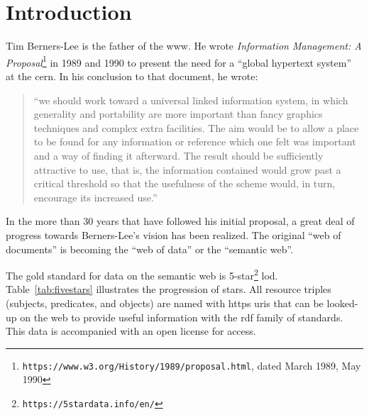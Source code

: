 
\chapter{Introduction}
\label{chap:intro}

\begin{doublespace}

Tim Berners-Lee is the father of the \ac{www}. 
He wrote 
\emph{Information Management: A Proposal}\footnote{{\tt https://www.w3.org/History/1989/proposal.html}, dated March 1989, May 1990} 
in 1989 and 1990 to present the need for a 
``global hypertext system'' at the \ac{cern}. 
In his conclusion to that document, he wrote:
\blockquote
{``we should work toward a universal linked information system, 
in which generality and portability are more important than fancy graphics techniques and complex extra facilities. 
The aim would be to allow a place to be found for any information or reference which one felt was important and a way of finding it afterward. 
The result should be sufficiently attractive to use, that is, 
the information contained would grow past a critical threshold so that the usefulness of the scheme would, in turn, 
encourage its increased use.''}

In the more than 30 years that have followed his initial proposal,
a great deal of progress towards Berners-Lee's vision has been realized. 
The original 
``web of documents'' is becoming the 
``web of data'' or the
``semantic web''. 

The gold standard for data on the semantic web is
5-star\footnote{\tt https://5stardata.info/en/} \ac{lod}.
Table~\ref{tab:fivestars} illustrates the progression of stars.
All resource triples (subjects, predicates, and objects) 
are named with \ac{https} \acp{uri} that can be looked-up on the web
to provide useful information with the \ac{rdf} family of standards.
This data is accompanied with an open license for access.



\end{doublespace}
